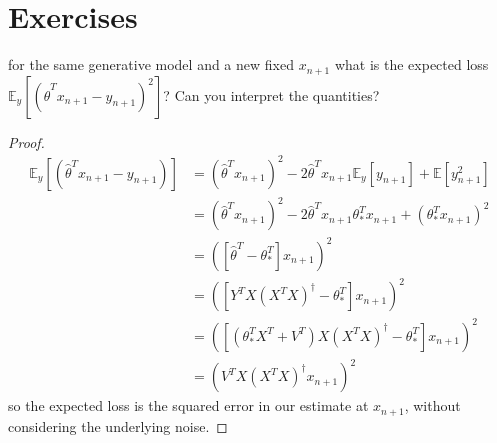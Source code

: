 \section{Exercises}
\begin{exercise}
for the same generative model and a new fixed $x_{n+1}$ what is the expected loss $\mathbb{E}_y[(\hat{\theta}^Tx_{n+1}-y_{n+1})^2]$? Can you interpret the quantities?
\end{exercise}
\begin{proof}
\begin{align*}
    \mathbb{E}_y[(\hat{\theta}^Tx_{n+1}-y_{n+1})]
    &=(\hat{\theta}^Tx_{n+1})^2-2\hat{\theta}^Tx_{n+1}\mathbb{E}_y[y_{n+1}]+\mathbb{E}[y_{n+1}^2] \\
    &=(\hat{\theta}^Tx_{n+1})^2-2\hat{\theta}^Tx_{n+1}\theta_{*}^Tx_{n+1}+(\theta_{*}^Tx_{n+1})^2 \\
    &=([\hat{\theta}^T-\theta_{*}^T]x_{n+1})^2\\
    &=([Y^TX(X^TX)^{\dag}-\theta_{*}^T]x_{n+1})^2\\
    &=([(\theta_{*}^TX^T+V^T)X(X^TX)^{\dag}-\theta_{*}^T]x_{n+1})^2\\
    &=(V^TX(X^TX)^{\dag}x_{n+1})^2
\end{align*}
so the expected loss is the squared error in our estimate at $x_{n+1}$, without considering the underlying noise.
\end{proof}

